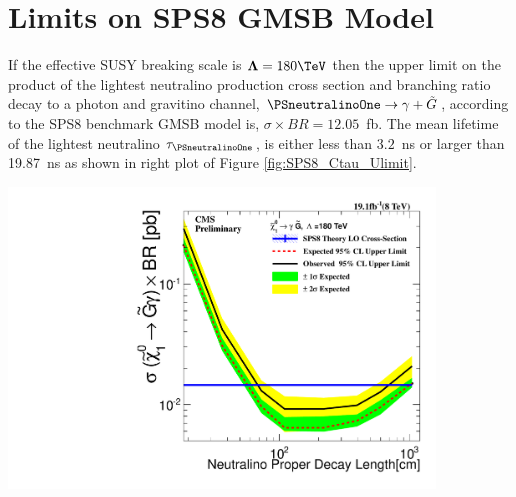 \clearpage

\section{Limits on SPS8 GMSB Model}
If the effective SUSY breaking scale is $\mathbf{\Lambda} = 180\TeV$ then the upper limit on the product of the lightest neutralino production cross section and branching ratio decay to a photon and gravitino channel, $\PSneutralinoOne \rightarrow \gamma + \tilde{G}$, according to the SPS8 benchmark GMSB model is, $\sigma\times BR = 12.05$~fb. The mean lifetime of the lightest neutralino $\tau_{\PSneutralinoOne}$, is either less than $3.2$~ns or larger than 19.87~ns as shown in right plot of Figure \ref{fig:SPS8_Ctau_Ulimit}.

\vspace{5mm}
\begin{minipage}{0.90\linewidth}
\begin{center}
\includegraphics[height=0.8\textwidth, width=0.85\textwidth]{THESISPLOTS/Neutralino_CrossSecTimesBR_Uplimit.pdf} 
\label{fig:SPS8_Ctau_Ulimit}
\end{center}
\end{minipage}
\vspace{5mm}

